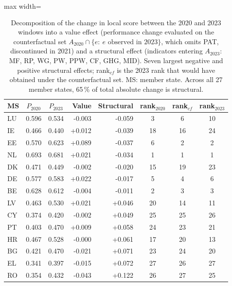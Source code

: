 \begin{table}[pos=t]\centering\footnotesize
\caption{Decomposition of the change in local score between the 2020 and 2023 windows into a value effect (performance change evaluated on the counterfactual set $A_{2020}\cap\{e:\ e \text{ observed in } 2023\}$, which omits PAT, discontinued in 2021) and a structural effect (indicators entering $A_{2023}$: MF, RP, WG, PW, PPW, CF, GHG, MID). Seven largest negative and positive structural effects; rank$_{cf}$ is the 2023 rank that would have obtained under the counterfactual set. MS: member state. Across all 27 member states, 65\,\% of total absolute change is structural.}
\label{tab:decomp}
\begin{adjustbox}{max width=\linewidth}\begin{tabular}{@{}lccrrccc@{}}\toprule
MS & $P_{2020}$ & $P_{2023}$ & Value & Structural & rank$_{2020}$ & rank$_{cf}$ & rank$_{2023}$ \\ \midrule
LU & 0.596 & 0.534 & -0.003 & -0.059 & 3 & 6 & 10 \\
IE & 0.466 & 0.440 & +0.012 & -0.039 & 18 & 16 & 24 \\
EE & 0.570 & 0.623 & +0.089 & -0.037 & 6 & 2 & 2 \\
NL & 0.693 & 0.681 & +0.021 & -0.034 & 1 & 1 & 1 \\
DK & 0.471 & 0.449 & -0.002 & -0.020 & 15 & 19 & 23 \\
DE & 0.577 & 0.583 & +0.022 & -0.017 & 5 & 4 & 6 \\
BE & 0.628 & 0.612 & -0.004 & -0.011 & 2 & 3 & 3 \\
LV & 0.463 & 0.530 & +0.021 & +0.046 & 20 & 14 & 11 \\
CY & 0.374 & 0.420 & -0.002 & +0.049 & 25 & 25 & 26 \\
PT & 0.403 & 0.470 & +0.009 & +0.058 & 24 & 23 & 21 \\
HR & 0.467 & 0.528 & -0.000 & +0.061 & 17 & 20 & 13 \\
BG & 0.421 & 0.470 & -0.021 & +0.071 & 23 & 24 & 20 \\
EL & 0.341 & 0.397 & -0.015 & +0.072 & 27 & 26 & 27 \\
RO & 0.354 & 0.432 & -0.043 & +0.122 & 26 & 27 & 25 \\
\bottomrule\end{tabular}\end{adjustbox}\end{table}
